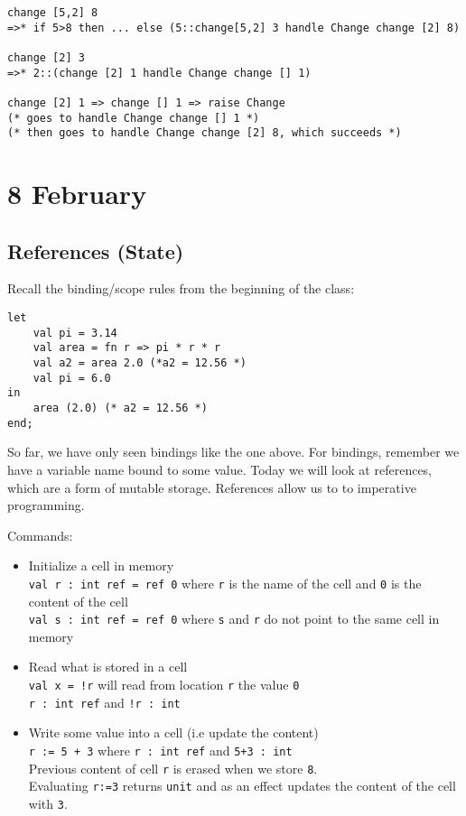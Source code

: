 \documentclass[11pt]{article}
\begin{document}
\begin{verbatim}
change [5,2] 8
=>* if 5>8 then ... else (5::change[5,2] 3 handle Change change [2] 8)

change [2] 3 
=>* 2::(change [2] 1 handle Change change [] 1)

change [2] 1 => change [] 1 => raise Change
(* goes to handle Change change [] 1 *)
(* then goes to handle Change change [2] 8, which succeeds *)
\end{verbatim}

\section{8 February}
\subsection{References (State)}

Recall the binding/scope rules from the beginning of the class:
\begin{verbatim}
let 
    val pi = 3.14
    val area = fn r => pi * r * r
	val a2 = area 2.0 (*a2 = 12.56 *)
	val pi = 6.0
in
    area (2.0) (* a2 = 12.56 *)
end;
\end{verbatim}

So far, we have only seen bindings like the one above. For bindings, remember we have a variable name bound to some value.
Today we will look at references, which are a form of mutable storage. References allow us to to imperative programming.

Commands:
\begin{itemize}
	\item Initialize a cell in memory \\
			\verb~val r : int ref = ref 0~ where \verb~r~ is the name of the cell and \verb~0~ is the content of the cell \\
			\verb~val s : int ref = ref 0~ where \verb~s~ and \verb~r~ do not point to the same cell in memory
	\item Read what is stored in a cell \\
			\verb~val x = !r~ will read from location \verb~r~ the value \verb~0~ \\
			\verb~r : int ref~ and \verb~!r : int~
	\item Write some value into a cell (i.e update the content) \\
			\verb~r := 5 + 3~ where \verb~r : int ref~ and \verb~5+3 : int~ \\
			Previous content of cell \verb~r~ is erased when we store \verb~8~. \\
		    Evaluating \verb~r:=3~ returns \verb~unit~ and as an effect updates the content of the cell with \verb~3~.
\end{itemize}
\end{document}
